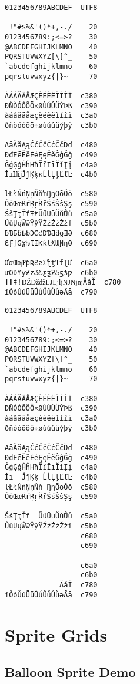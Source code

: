 \begin{minipage}{5cm}
\verbatimfont{\codefont}
\begin{verbatim}
0123456789ABCDEF  UTF8
----------------------
 !"#$%
0123456789:;<=>?    30
@ABCDEFGHIJKLMNO    40
PQRSTUVWXYZ[\]^_    50
`abcdefghijklmno    60
pqrstuvwxyz{|}~     70

ÀÁÂÃÄÅÆÇÈÉÊËÌÍÎÏ  c380
ÐÑÒÓÔÕÖ×ØÙÚÛÜÝÞß  c390
àáâãäåæçèéêëìíîï  c3a0
ðñòóôõö÷øùúûüýþÿ  c3b0

ĀāĂăĄąĆćĈĉĊċČčĎď  c480
ĐđĒēĔĕĖėĘęĚěĜĝĞğ  c490
ĠġĢģĤĥĦħĨĩĪīĬĭĮį  c4a0
İıĲĳĴĵĶķĸĹĺĻļĽľĿ  c4b0

ŀŁłŃńŅņŇňŉŊŋŌōŎŏ  c580
ŐőŒœŔŕŖŗŘřŚśŜŝŞş  c590
ŠšŢţŤťŦŧŨũŪūŬŭŮů  c5a0
ŰűŲųŴŵŶŷŸŹźŻżŽžſ  c5b0
ƀƁƂƃƄƅƆƇƈƉƊƋƌƍƎƏ  c680
ƐƑƒƓƔƕƖƗƘƙƚƛƜƝƞƟ  c690

ƠơƢƣƤƥƦƧƨƩƪƫƬƭƮƯ  c6a0
ưƱƲƳƴƵƶƷƸƹƺƻƼƽƾƿ  c6b0
ǀǁǂǃǄǅǆǇǈǉǊǋǌǍǎǏ  c780
ǐǑǒǓǔǕǖǗǘǙǚǛǜǝǞǟ  c790
\end{verbatim}
\end{minipage}
\begin{minipage}{5cm}
\verbatimfont{\ttfamily}
\begin{verbatim}
0123456789ABCDEF  UTF8
----------------------
 !"#$%&'()*+,-./    20
0123456789:;<=>?    30
@ABCDEFGHIJKLMNO    40
PQRSTUVWXYZ[\]^_    50
`abcdefghijklmno    60
pqrstuvwxyz{|}~     70

ÀÁÂÃÄÅÆÇÈÉÊËÌÍÎÏ  c380
ÐÑÒÓÔÕÖ×ØÙÚÛÜÝÞß  c390
àáâãäåæçèéêëìíîï  c3a0
ðñòóôõö÷øùúûüýþÿ  c3b0

ĀāĂăĄąĆćĈĉĊċČčĎď  c480
ĐđĒēĔĕĖėĘęĚěĜĝĞğ  c490
ĠġĢģĤĥĦħĨĩĪīĬĭĮį  c4a0
İı  ĴĵĶķ ĹĺĻļĽľĿ  c4b0
ŀŁłŃńŅņŇň ŊŋŌōŎŏ  c580
ŐőŒœŔŕŖŗŘřŚśŜŝŞş  c590

ŠšŢţŤť  ŨũŪūŬŭŮů  c5a0
ŰűŲųŴŵŶŷŸŹźŻżŽžſ  c5b0
                  c680
                  c690

                  c6a0
                  c6b0
             ǍǎǏ  c780
ǐǑǒǓǔǕǖǗǘǙǚǛǜǝǞǟ  c790
\end{verbatim}
\end{minipage}

\section{Sprite Grids}
\subsection{Balloon Sprite Demo}

